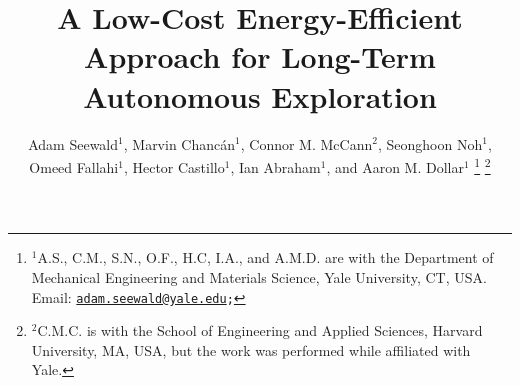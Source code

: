 \documentclass[lettersize,journal,twoside]{IEEEtran}
\theoremstyle{definition}
\begin{document}

\title{A Low-Cost Energy-Efficient Approach for Long-Term %
Autonomous Exploration}%

\author{Adam Seewald${}^\text{1}$, Marvin Chanc{\'a}n${}^\text{1}$, Connor M. McCann${}^\text{2}$, Seonghoon Noh${}^\text{1}$, Omeed Fallahi${}^\text{1}$, Hector Castillo${}^\text{1}$, %
Ian Abraham${}^\text{1}$, and Aaron M. Dollar${}^\text{1}$%
  \thanks{${}^\text{1}$A.\hspace*{.4ex}S., C.\hspace*{.4ex}M., S.\hspace*{.4ex}N., O.\hspace*{.4ex}F., H.\hspace*{.4ex}C, I.\hspace*{.4ex}A., and A.\hspace*{.4ex}M.\hspace*{.4ex}D. are with the Department of Mechanical Engineering and Materials Science, Yale University, CT, USA. Email: {\tt\footnotesize \href{mailto:adam.seewald@yale.edu}{adam.seewald@yale.edu};}}
  \thanks{${}^\text{2}$C.\hspace*{.4ex}M.\hspace*{.4ex}C. is with the School of Engineering and Applied Sciences, Harvard University, MA, USA, but the work was performed while affiliated with Yale.}
}
\end{document}
